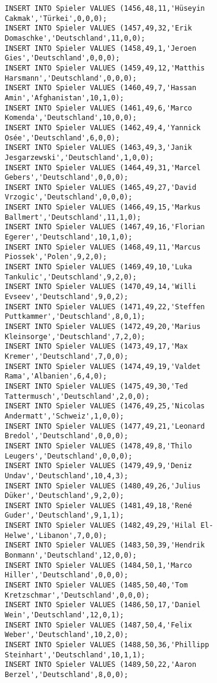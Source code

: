 \documentclass{bschlangaul-aufgabe}
\begin{document}
\begin{verbatim}
INSERT INTO Spieler VALUES (1456,48,11,'Hüseyin Cakmak','Türkei',0,0,0);
INSERT INTO Spieler VALUES (1457,49,32,'Erik Domaschke','Deutschland',11,0,0);
INSERT INTO Spieler VALUES (1458,49,1,'Jeroen Gies','Deutschland',0,0,0);
INSERT INTO Spieler VALUES (1459,49,12,'Matthis Harsmann','Deutschland',0,0,0);
INSERT INTO Spieler VALUES (1460,49,7,'Hassan Amin','Afghanistan',10,1,0);
INSERT INTO Spieler VALUES (1461,49,6,'Marco Komenda','Deutschland',10,0,0);
INSERT INTO Spieler VALUES (1462,49,4,'Yannick Osée','Deutschland',6,0,0);
INSERT INTO Spieler VALUES (1463,49,3,'Janik Jesgarzewski','Deutschland',1,0,0);
INSERT INTO Spieler VALUES (1464,49,31,'Marcel Gebers','Deutschland',0,0,0);
INSERT INTO Spieler VALUES (1465,49,27,'David Vrzogic','Deutschland',0,0,0);
INSERT INTO Spieler VALUES (1466,49,15,'Markus Ballmert','Deutschland',11,1,0);
INSERT INTO Spieler VALUES (1467,49,16,'Florian Egerer','Deutschland',10,1,0);
INSERT INTO Spieler VALUES (1468,49,11,'Marcus Piossek','Polen',9,2,0);
INSERT INTO Spieler VALUES (1469,49,10,'Luka Tankulic','Deutschland',9,2,0);
INSERT INTO Spieler VALUES (1470,49,14,'Willi Evseev','Deutschland',9,0,2);
INSERT INTO Spieler VALUES (1471,49,22,'Steffen Puttkammer','Deutschland',8,0,1);
INSERT INTO Spieler VALUES (1472,49,20,'Marius Kleinsorge','Deutschland',7,2,0);
INSERT INTO Spieler VALUES (1473,49,17,'Max Kremer','Deutschland',7,0,0);
INSERT INTO Spieler VALUES (1474,49,19,'Valdet Rama','Albanien',6,4,0);
INSERT INTO Spieler VALUES (1475,49,30,'Ted Tattermusch','Deutschland',2,0,0);
INSERT INTO Spieler VALUES (1476,49,25,'Nicolas Andermatt','Schweiz',1,0,0);
INSERT INTO Spieler VALUES (1477,49,21,'Leonard Bredol','Deutschland',0,0,0);
INSERT INTO Spieler VALUES (1478,49,8,'Thilo Leugers','Deutschland',0,0,0);
INSERT INTO Spieler VALUES (1479,49,9,'Deniz Undav','Deutschland',10,4,3);
INSERT INTO Spieler VALUES (1480,49,26,'Julius Düker','Deutschland',9,2,0);
INSERT INTO Spieler VALUES (1481,49,18,'René Guder','Deutschland',9,1,1);
INSERT INTO Spieler VALUES (1482,49,29,'Hilal El-Helwe','Libanon',7,0,0);
INSERT INTO Spieler VALUES (1483,50,39,'Hendrik Bonmann','Deutschland',12,0,0);
INSERT INTO Spieler VALUES (1484,50,1,'Marco Hiller','Deutschland',0,0,0);
INSERT INTO Spieler VALUES (1485,50,40,'Tom Kretzschmar','Deutschland',0,0,0);
INSERT INTO Spieler VALUES (1486,50,17,'Daniel Wein','Deutschland',12,0,1);
INSERT INTO Spieler VALUES (1487,50,4,'Felix Weber','Deutschland',10,2,0);
INSERT INTO Spieler VALUES (1488,50,36,'Phillipp Steinhart','Deutschland',10,1,1);
INSERT INTO Spieler VALUES (1489,50,22,'Aaron Berzel','Deutschland',8,0,0);

\end{verbatim}
\end{document}
